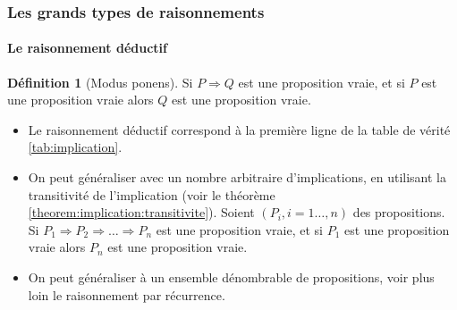 \documentclass[10pt,notheorems]{beamer}
\theoremstyle{plain}
\theoremstyle{definition} %
\newtheorem{definition}{Définition}
\begin{document}
\begin{frame}
  \frametitle{Les grands types de raisonnements}
  \framesubtitle{Le raisonnement déductif}
  \hypertarget{slide_raisonnement_deductif}{}

  \begin{definition}[Modus ponens]
    Si $P\Rightarrow Q$ est une proposition vraie, et si $P$ est une
    proposition vraie alors $Q$ est une proposition vraie.
  \end{definition}

  \begin{itemize}

    \bigskip

  \item Le raisonnement déductif correspond à la première ligne de la
    table de vérité \hyperlink{slide_implication_1}{\ref{tab:implication}}.\newline

  \item On peut généraliser avec un nombre arbitraire d'implications,
    en utilisant la transitivité de l'implication
    (voir le théorème \hyperlink{slide_implication_transitivite}{\ref{theorem:implication:transitivite}}). Soient
    $(P_i, i=1\dots,n)$ des propositions. Si $P_1\Rightarrow P_2 \Rightarrow \dots \Rightarrow P_n$ est une proposition vraie, et si $P_1$ est une proposition vraie alors $P_n$ est une proposition vraie.\newline

  \item On peut généraliser à un ensemble dénombrable de propositions, voir plus loin le raisonnement par récurrence.

  \end{itemize}
\end{frame}

\end{document}
